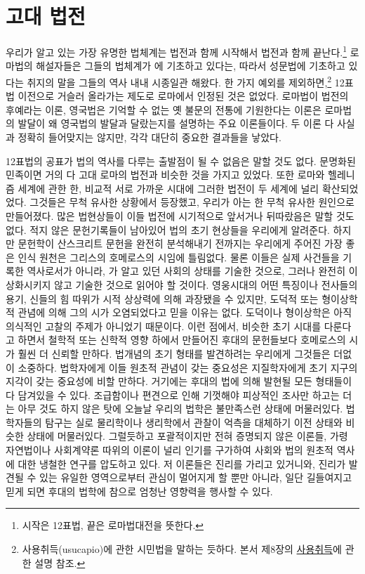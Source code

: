 
\chapter{고대 법전}

우리가 알고 있는 가장 유명한 법체계는 법전과 함께 시작해서
법전과 함께 끝난다.\footnote{시작은 12표법, 끝은 로마법대전을 뜻한다.}
로마법의 해설자들은 그들의 법체계가 에 기초하고 있다는,
따라서 성문법에 기초하고 있다는 취지의 말을 그들의 역사 내내 시종일관 해왔다.
한 가지 예외를 제외하면,\footnote{%
  사용취득(usucapio)에 관한 시민법을 말하는 듯하다.
  본서 제8장의 \hyperlink{usucapio}{사용취득}에 관한 설명 참조.}
12표법 이전으로 거슬러 올라가는 제도로 로마에서 인정된 것은 없었다.
로마법이 법전의 후예라는 이론, 영국법은 기억할 수 없는
옛 불문의 전통에 기원한다는 이론은
로마법의 발달이 왜 영국법의 발달과 달랐는지를 설명하는 주요 이론들이다.
두 이론 다 사실과 정확히 들어맞지는 않지만, 각각 대단히 중요한 결과들을 낳았다.

12표법의 공표가 법의 역사를 다루는 출발점이 될 수 없음은 말할 것도 없다.
문명화된 민족이면 거의 다 고대 로마의 법전과 비슷한 것을 가지고 있었다.
또한 로마와 헬레니즘 세계에 관한 한, 비교적 서로 가까운 시대에
그러한 법전이 두 세계에 널리 확산되었었다.
그것들은 무척 유사한 상황에서 등장했고, 우리가 아는 한
무척 유사한 원인으로 만들어졌다.
많은 법현상들이 이들 법전에 시기적으로 앞서거나 뒤따랐음은 말할 것도 없다.
적지 않은 문헌기록들이 남아있어 법의 초기 현상들을 우리에게 알려준다.
하지만 문헌학이 산스크리트 문헌을 완전히 분석해내기 전까지는
우리에게 주어진 가장 좋은 인식 원천은 그리스의 호메로스의 시임에 틀림없다.
물론 이들은 실제 사건들을 기록한 역사로서가 아니라,
가 알고 있던 사회의 상태를 기술한 것으로,
그러나 완전히 이상화시키지 않고 기술한 것으로 읽어야 할 것이다.
영웅시대의 어떤 특징이나 전사들의 용기, 신들의 힘 따위가
시적 상상력에 의해 과장됐을 수 있지만, 도덕적 또는 형이상학적 관념에 의해
그의 시가 오염되었다고 믿을 이유는 없다.
도덕이나 형이상학은 아직 의식적인 고찰의 주제가 아니었기 때문이다.
이런 점에서, 비슷한 초기 시대를 다룬다고 하면서
철학적 또는 신학적 영향 하에서 만들어진 후대의 문헌들보다
호메로스의 시가 훨씬 더 신뢰할 만하다.
법개념의 초기 형태를 발견하려는 우리에게 그것들은 더없이 소중하다.
법학자에게 이들 원초적 관념이 갖는 중요성은
지질학자에게 초기 지구의 지각이 갖는 중요성에 비할 만하다.
거기에는 후대의 법에 의해 발현될 모든 형태들이 다 담겨있을 수 있다.
조급함이나 편견으로 인해 기껏해야 피상적인 조사만 하고는 더는
아무 것도 하지 않은 탓에 오늘날 우리의 법학은 불만족스런 상태에 머물러있다.
법학자들의 탐구는 실로 물리학이나 생리학에서 관찰이 억측을 대체하기 이전
상태와 비슷한 상태에 머물러있다.
그럴듯하고 포괄적이지만 전혀 증명되지 않은 이론들, 가령
자연법이나 사회계약론 따위의 이론이 널리 인기를 구가하여
사회와 법의 원초적 역사에 대한 냉철한 연구를 압도하고 있다.
저 이론들은 진리를 가리고 있거니와,
진리가 발견될 수 있는 유일한 영역으로부터 관심이 멀어지게 할 뿐만 아니라,
일단 길들여지고 믿게 되면 후대의 법학에 참으로 엄청난 영향력을
행사할 수 있다.

